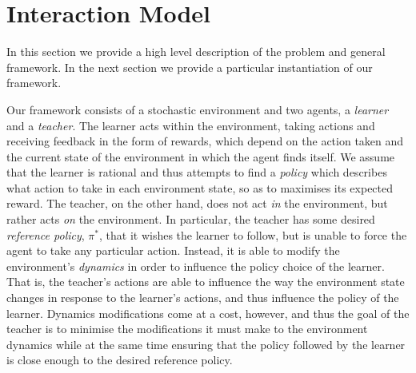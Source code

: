 

\section{Interaction Model}\label{sec: GeneralModel}

In this section we provide a high level description of the problem and
general framework.  In the next section we provide a particular
instantiation of our framework.

Our framework consists of a stochastic environment and two agents, a
\emph{learner} and a \emph{teacher}.  The learner acts within the
environment, taking actions and receiving feedback in the form of
rewards, which depend on the action taken and the current state of the
environment in which the agent finds itself.  We assume that the
learner is rational and thus attempts to find a \emph{policy} which
describes what action to take in each environment state, so as to
maximises its expected reward.  The teacher, on the other hand, does
not act \emph{in} the environment, but rather acts \emph{on} the
environment.  In particular, the teacher has some desired
\emph{reference policy}, $\pi^*$, that it wishes the learner to
follow, but is unable to force the agent to take any particular
action.  Instead, it is able to modify the environment's
\emph{dynamics} in order to influence the policy choice of the
learner. That is, the teacher's actions are able to influence the way
the environment state changes in response to the learner's actions,
and thus influence the policy of the learner. Dynamics modifications
come at a cost, however, and thus the goal of the teacher is to
minimise the modifications it must make to the environment dynamics
while at the same time ensuring that the policy followed by the
learner is close enough to the desired reference policy.

